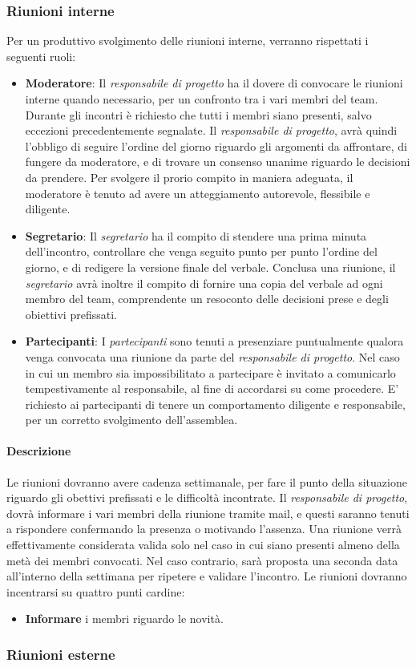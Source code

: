 \subsubsection{Riunioni interne}
Per un produttivo svolgimento delle riunioni interne, verranno rispettati i seguenti ruoli:
\begin{itemize}
\item\textbf{Moderatore}: Il \emph{responsabile di progetto} ha il dovere di convocare le riunioni interne quando necessario, per un confronto tra i vari membri del team.
Durante gli incontri è richiesto che tutti i membri siano presenti, salvo eccezioni precedentemente segnalate.
Il \emph{responsabile di progetto}, avrà quindi l'obbligo di seguire l'ordine del giorno riguardo gli argomenti da affrontare,
di fungere da moderatore, e di trovare un consenso unanime riguardo le decisioni da prendere.
Per svolgere il prorio compito in maniera adeguata, il moderatore è tenuto ad avere un atteggiamento autorevole, flessibile
e diligente.
\item\textbf{Segretario}: Il \emph{segretario} ha il compito di stendere una prima minuta dell'incontro, controllare che venga seguito punto per punto l'ordine del giorno, e di redigere la versione finale del verbale.
Conclusa una riunione, il \emph{segretario} avrà inoltre il compito di fornire una copia del verbale ad ogni membro del team,
comprendente un resoconto delle decisioni prese e degli obiettivi prefissati.
\item\textbf{Partecipanti}: I \emph{partecipanti} sono tenuti a presenziare puntualmente qualora venga convocata una riunione da parte del \emph{responsabile di progetto}. Nel caso in cui un membro sia impossibilitato a partecipare è invitato
a comunicarlo tempestivamente al responsabile, al fine di accordarsi su come procedere. E' richiesto ai partecipanti di
tenere un comportamento diligente e responsabile, per un corretto svolgimento dell'assemblea.
\end{itemize}

\paragraph{Descrizione}
Le riunioni dovranno avere cadenza settimanale, per fare il punto della situazione riguardo gli obettivi prefissati e
le difficoltà incontrate. Il \emph{responsabile di progetto}, dovrà informare i vari membri della riunione tramite mail, e questi saranno tenuti a rispondere confermando la presenza o motivando l'assenza. Una riunione verrà effettivamente considerata
valida solo nel caso in cui siano presenti almeno della metà dei membri convocati. Nel caso contrario, sarà proposta una seconda data all'interno della settimana per ripetere e validare l'incontro.
Le riunioni dovranno incentrarsi su quattro punti cardine:
\begin{itemize}
\item\textbf{Informare} i membri riguardo le novità.
\end{itemize}
\subsubsection{Riunioni esterne}






	